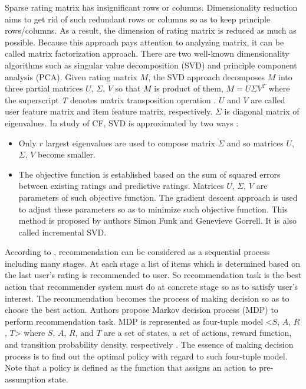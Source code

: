 \documentclass{sig-alternate}
\begin{document}
Sparse rating matrix has insignificant rows or columns. Dimensionality reduction aims to get rid of such redundant rows or columns so as to keep principle rows/columns. As a result, the dimension of rating matrix is reduced as much as possible. Because this approach pays attention to analyzing matrix, it can be called matrix factorization approach. There are two well-known dimensionality algorithms such as singular value decomposition (SVD) and principle component analysis (PCA). Given rating matrix $M$, the SVD approach decomposes $M$ into three partial matrices $U$, $\Sigma$, $V$ so that $M$ is product of them, $M = U \Sigma V^T$ where the superscript \textit{T} denotes matrix transposition operation \cite[p.~1]{percy:svd}. $U$ and $V$ are called user feature matrix and item feature matrix, respectively. $\Sigma$ is diagonal matrix of eigenvalues. In study of CF, SVD is approximated by two ways \cite[pp.~2-5]{percy:svd}:
\begin{itemize}
\item Only $r$ largest eigenvalues are used to compose matrix $\Sigma$ and so matrices $U$, $\Sigma$, $V$ become smaller.
\item The objective function is established based on the sum of squared errors between existing ratings and predictive ratings. Matrices $U$, $\Sigma$, $V$ are parameters of such objective function. The gradient descent approach is used to adjust these parameters so as to minimize such objective function. This method is proposed by authors Simon Funk and Genevieve Gorrell. It is also called incremental SVD.
\end{itemize}

According to \cite[p.~1266]{shani:mdp}, recommendation can be considered as a sequential process including many stages. At each stage a list of items which is determined based on the last user's rating is recommended to user. So recommendation task is the best action that recommender system must do at concrete stage so as to satisfy user's interest. The recommendation becomes the process of making decision so as to choose the best action. Authors \cite[p.~1266]{shani:mdp} propose Markov decision process (MDP) to perform recommendation task. MDP is represented as four-tuple model <$S$, $A$, $R$, $T$> where $S$, $A$, $R$, and $T$ are a set of states, a set of actions, reward function, and transition probability density, respectively \cite[pp.~1270-1271]{shani:mdp}. The essence of making decision process is to find out the optimal policy with regard to such four-tuple model. Note that a policy is defined as the function that assigns an action to pre-assumption state.
\end{document}
